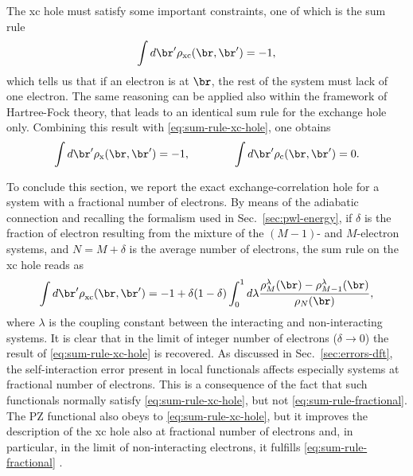 The xc hole must satisfy some important constraints, one of which is the sum rule
%
\begin{equation}
    \int d\br' \rho_{\rm xc}(\br,\br') = -1 ,
    \label{eq:sum-rule-xc-hole}
\end{equation}
%
which tells us that if an electron is at $\br$, the rest of the system must lack of one electron. The same reasoning can be applied also within the framework of Hartree-Fock theory, that leads to an identical sum rule for the exchange hole only. Combining this result with \cref{eq:sum-rule-xc-hole}, one obtains
%
\begin{equation}
    \int d\br' \rho_{\rm x}(\br,\br') = -1, \qquad \qquad \int d\br' \rho_{\rm c}(\br,\br') = 0 .
    \label{eq:sum-rule-x-hole-c-hole}
\end{equation}

To conclude this section, we report the exact exchange-correlation hole for a system with a fractional number of electrons. By means of the adiabatic connection and recalling the formalism used in Sec.~\ref{sec:pwl-energy}, if $\delta$ is the fraction of electron resulting from the mixture of the $(M-1)$- and $M$-electron systems, and $N=M+\delta$ is the average number of electrons, the sum rule on the xc hole reads as \cite{perdew_what_1985}
%
\begin{equation}
    \int d\br' \rho_{\rm xc}^{\rm}(\br,\br') = -1 + \delta(1-\delta) \int_0^1 d\lambda \frac{\rho_{M}^{\lambda}(\br) - \rho_{M-1}^{\lambda}(\br)}{\rho_N(\br)} ,
    \label{eq:sum-rule-fractional}
\end{equation}
%
where $\lambda$ is the coupling constant between the interacting and non-interacting systems. It is clear that in the limit of integer number of electrons ($\delta \longrightarrow 0$) the result of \cref{eq:sum-rule-xc-hole} is recovered. As discussed in Sec.~\ref{sec:errors-dft}, the self-interaction error present in local functionals affects especially systems at fractional number of electrons. This is a consequence of the fact that such functionals normally satisfy \cref{eq:sum-rule-xc-hole}, but not \cref{eq:sum-rule-fractional}. The PZ functional also obeys to \cref{eq:sum-rule-xc-hole}, but it improves the description of the xc hole also at fractional number of electrons and, in particular, in the limit of non-interacting electrons, it fulfills \cref{eq:sum-rule-fractional} \cite{perdew_what_1985}.